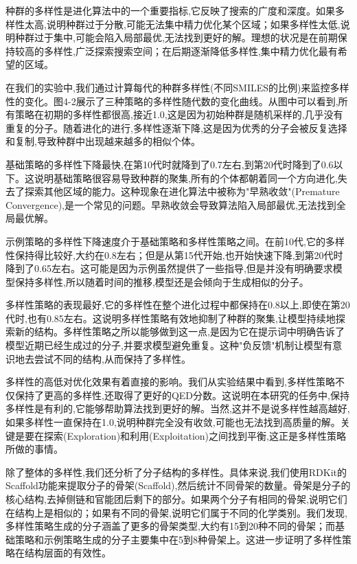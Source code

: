 种群的多样性是进化算法中的一个重要指标,它反映了搜索的广度和深度。如果多样性太高,说明种群过于分散,可能无法集中精力优化某个区域；如果多样性太低,说明种群过于集中,可能会陷入局部最优,无法找到更好的解。理想的状况是在前期保持较高的多样性,广泛探索搜索空间；在后期逐渐降低多样性,集中精力优化最有希望的区域。

在我们的实验中,我们通过计算每代的种群多样性(不同SMILES的比例)来监控多样性的变化。图4-2展示了三种策略的多样性随代数的变化曲线。从图中可以看到,所有策略在初期的多样性都很高,接近1.0,这是因为初始种群是随机采样的,几乎没有重复的分子。随着进化的进行,多样性逐渐下降,这是因为优秀的分子会被反复选择和复制,导致种群中出现越来越多的相似个体。

基础策略的多样性下降最快,在第10代时就降到了0.7左右,到第20代时降到了0.6以下。这说明基础策略很容易导致种群的聚集,所有的个体都朝着同一个方向进化,失去了探索其他区域的能力。这种现象在进化算法中被称为"早熟收敛"(Premature Convergence),是一个常见的问题。早熟收敛会导致算法陷入局部最优,无法找到全局最优解。

示例策略的多样性下降速度介于基础策略和多样性策略之间。在前10代,它的多样性保持得比较好,大约在0.8左右；但是从第15代开始,也开始快速下降,到第20代时降到了0.65左右。这可能是因为示例虽然提供了一些指导,但是并没有明确要求模型保持多样性,所以随着时间的推移,模型还是会倾向于生成相似的分子。

多样性策略的表现最好,它的多样性在整个进化过程中都保持在0.8以上,即使在第20代时,也有0.85左右。这说明多样性策略有效地抑制了种群的聚集,让模型持续地探索新的结构。多样性策略之所以能够做到这一点,是因为它在提示词中明确告诉了模型近期已经生成过的分子,并要求模型避免重复。这种"负反馈"机制让模型有意识地去尝试不同的结构,从而保持了多样性。

多样性的高低对优化效果有着直接的影响。我们从实验结果中看到,多样性策略不仅保持了更高的多样性,还取得了更好的QED分数。这说明在本研究的任务中,保持多样性是有利的,它能够帮助算法找到更好的解。当然,这并不是说多样性越高越好,如果多样性一直保持在1.0,说明种群完全没有收敛,可能也无法找到高质量的解。关键是要在探索(Exploration)和利用(Exploitation)之间找到平衡,这正是多样性策略所做的事情。

除了整体的多样性,我们还分析了分子结构的多样性。具体来说,我们使用RDKit的Scaffold功能来提取分子的骨架(Scaffold),然后统计不同骨架的数量。骨架是分子的核心结构,去掉侧链和官能团后剩下的部分。如果两个分子有相同的骨架,说明它们在结构上是相似的；如果有不同的骨架,说明它们属于不同的化学类别。我们发现,多样性策略生成的分子涵盖了更多的骨架类型,大约有15到20种不同的骨架；而基础策略和示例策略生成的分子主要集中在5到8种骨架上。这进一步证明了多样性策略在结构层面的有效性。

